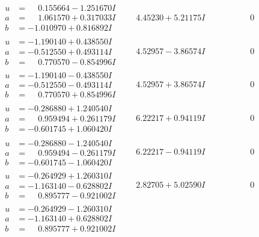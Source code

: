 \documentclass[1p]{elsarticle_modified}
\theoremstyle{definition}
\begin{document}
$$\begin{array}{c|c|c}
\begin{aligned}
u &= \phantom{-}0.155664 - 1.251670 I \\
a &= \phantom{-}1.061570 + 0.317033 I \\
b &= -1.010970 + 0.816892 I\end{aligned}
 & \phantom{-}4.45230 + 5.21175 I & \phantom{-0.000000 } 0 \\ \hline\begin{aligned}
u &= -1.190140 + 0.438550 I \\
a &= -0.512550 + 0.493114 I \\
b &= \phantom{-}0.770570 - 0.854996 I\end{aligned}
 & \phantom{-}4.52957 - 3.86574 I & \phantom{-0.000000 } 0 \\ \hline\begin{aligned}
u &= -1.190140 - 0.438550 I \\
a &= -0.512550 - 0.493114 I \\
b &= \phantom{-}0.770570 + 0.854996 I\end{aligned}
 & \phantom{-}4.52957 + 3.86574 I & \phantom{-0.000000 } 0 \\ \hline\begin{aligned}
u &= -0.286880 + 1.240540 I \\
a &= \phantom{-}0.959494 + 0.261179 I \\
b &= -0.601745 + 1.060420 I\end{aligned}
 & \phantom{-}6.22217 + 0.94119 I & \phantom{-0.000000 } 0 \\ \hline\begin{aligned}
u &= -0.286880 - 1.240540 I \\
a &= \phantom{-}0.959494 - 0.261179 I \\
b &= -0.601745 - 1.060420 I\end{aligned}
 & \phantom{-}6.22217 - 0.94119 I & \phantom{-0.000000 } 0 \\ \hline\begin{aligned}
u &= -0.264929 + 1.260310 I \\
a &= -1.163140 - 0.628802 I \\
b &= \phantom{-}0.895777 - 0.921002 I\end{aligned}
 & \phantom{-}2.82705 + 5.02590 I & \phantom{-0.000000 } 0 \\ \hline\begin{aligned}
u &= -0.264929 - 1.260310 I \\
a &= -1.163140 + 0.628802 I \\
b &= \phantom{-}0.895777 + 0.921002 I\end{aligned}

\end{array}$$
\end{document}
